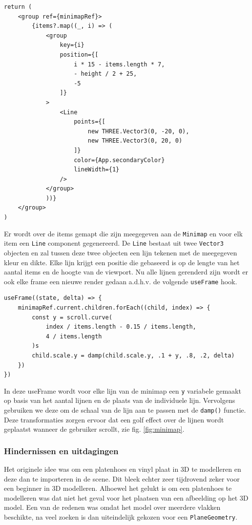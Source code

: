 \begin{BVerbatim}
return (
	<group ref={minimapRef}>
		{items?.map((_, i) => (
			<group 
				key={i} 
				position={[
					i * 15 - items.length * 7,
					- height / 2 + 25,
					-5
				]}
			>
				<Line 
					points={[
						new THREE.Vector3(0, -20, 0),
						new THREE.Vector3(0, 20, 0)
					]} 
					color={App.secondaryColor} 
					lineWidth={1}
				/>
			</group>
			))}
	</group>
)
\end{BVerbatim}
\newline
\newline
Er wordt over de items gemapt die zijn meegegeven aan de \texttt{Minimap} en voor elk item een \texttt{Line} component gegenereerd. De \texttt{Line} bestaat uit twee \texttt{Vector3} objecten en zal tussen deze twee objecten een lijn tekenen met de meegegeven kleur en dikte. Elke lijn krijgt een positie die gebaseerd is op de lengte van het aantal items en de hoogte van de viewport.
Nu alle lijnen gerenderd zijn wordt er ook elke frame een nieuwe render gedaan a.d.h.v. de volgende \texttt{useFrame} hook.
\newline
\newline
\begin{BVerbatim}
useFrame((state, delta) => {
	minimapRef.current.children.forEach((child, index) => {
		const y = scroll.curve(
			index / items.length - 0.15 / items.length,
			4 / items.length
		)s
		child.scale.y = damp(child.scale.y, .1 + y, .8, .2, delta)
	})
})
\end{BVerbatim}

In deze useFrame wordt voor elke lijn van de minimap een \texttt{y} variabele gemaakt op basis van het aantal lijnen en de plaats van de individuele lijn. Vervolgens gebruiken we deze om de schaal van de lijn aan te passen met de \texttt{damp()} functie. Deze transformaties zorgen ervoor dat een golf effect over de lijnen wordt geplaatst wanneer de gebruiker scrollt, zie fig. \ref{fig:minimap}.

\subsubsection{Hindernissen en uitdagingen}

Het originele idee was om een platenhoes en vinyl plaat in 3D te modelleren en deze dan te importeren in de scene. Dit bleek echter zeer tijdrovend zeker voor een beginner in 3D modelleren. Alhoewel het gelukt is om een platenhoes te modelleren was dat niet het geval voor het plaatsen van een afbeelding op het 3D model. Een van de redenen was omdat het model over meerdere vlakken beschikte, na veel zoeken is dan uiteindelijk gekozen voor een \texttt{PlaneGeometry}.